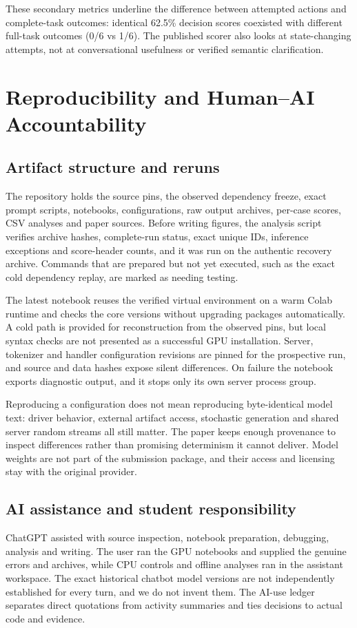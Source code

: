 \documentclass[conference]{IEEEtran}
\begin{document}
These secondary metrics underline the difference between attempted actions and complete-task outcomes: identical 62.5\% decision scores coexisted with different full-task outcomes (0/6 vs 1/6). The published scorer also looks at state-changing attempts, not at conversational usefulness or verified semantic clarification.

\section{Reproducibility and Human--AI Accountability}
\subsection{Artifact structure and reruns}
The repository holds the source pins, the observed dependency freeze, exact prompt scripts, notebooks, configurations, raw output archives, per-case scores, CSV analyses and paper sources. Before writing figures, the analysis script verifies archive hashes, complete-run status, exact unique IDs, inference exceptions and score-header counts, and it was run on the authentic recovery archive. Commands that are prepared but not yet executed, such as the exact cold dependency replay, are marked as needing testing.

The latest notebook reuses the verified virtual environment on a warm Colab runtime and checks the core versions without upgrading packages automatically. A cold path is provided for reconstruction from the observed pins, but local syntax checks are not presented as a successful GPU installation. Server, tokenizer and handler configuration revisions are pinned for the prospective run, and source and data hashes expose silent differences. On failure the notebook exports diagnostic output, and it stops only its own server process group.

Reproducing a configuration does not mean reproducing byte-identical model text: driver behavior, external artifact access, stochastic generation and shared server random streams all still matter. The paper keeps enough provenance to inspect differences rather than promising determinism it cannot deliver. Model weights are not part of the submission package, and their access and licensing stay with the original provider.

\subsection{AI assistance and student responsibility}
ChatGPT assisted with source inspection, notebook preparation, debugging, analysis and writing. The user ran the GPU notebooks and supplied the genuine errors and archives, while CPU controls and offline analyses ran in the assistant workspace. The exact historical chatbot model versions are not independently established for every turn, and we do not invent them. The AI-use ledger separates direct quotations from activity summaries and ties decisions to actual code and evidence.
\end{document}
